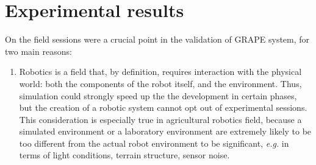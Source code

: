 
\chapter{Experimental results} \label{chap:experimentalResults}

On the field sessions were a crucial point in the validation of \ac{GRAPE} system, for two main reasons:
\begin{enumerate}
	
	\item Robotics is a field that, by definition, requires interaction with the physical world: both the components of the robot itself, and the environment. Thus, simulation could strongly speed up the the development in certain phases, but the creation of a robotic system cannot opt out of experimental sessions. This consideration is especially true in agricultural robotics field, because a simulated environment or a laboratory environment are extremely likely to be too different from the actual robot environment to be significant, \textit{e.g.} in terms of light conditions, terrain structure, sensor noise.


\end{enumerate}
